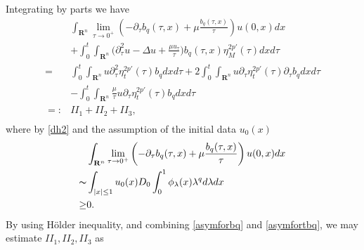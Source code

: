 \documentclass[review]{elsarticle}
\newcommand{\R}{\mathbf{R}}
\begin{document}
Integrating by parts we have
\begin{equation}\label{C17}
\begin{aligned}
&\int_{\R^n}\lim_{\tau\rightarrow 0^+}\left(-\partial_\tau b_q(\tau,x)+\mu\frac{b_q(\tau,x)}{\tau}\right)u(0,x)dx\\
&+\int_0^t\int_{\R^n}\bigg(\partial_\tau^2u-\Delta u +\frac{\mu u_\tau}{\tau}\bigg)b_q(\tau,x)\eta^{2p'}_M(\tau)dxd\tau\\
=&\int_0^t\int_{\R^n}u\partial_\tau^2\eta_t^{2p'}(\tau)b_qdxd\tau+
2\int_0^t\int_{\R^n}u\partial_\tau\eta_t^{2p'}(\tau)\partial_\tau b_qdxd\tau\\
&-\int_0^t\int_{\R^n}\frac{\mu}{\tau}u\partial_\tau\eta_t^{2p'}(\tau)b_qdxd\tau\\
=:& II_1+II_2+II_3,\\
\end{aligned}
\end{equation}
where by \eqref{dh2} and the assumption of the initial data $u_0(x)$
\begin{equation}
\begin{aligned}\label{C00}
&\int_{\R^n}\lim_{\tau\rightarrow 0^+}\left(-\partial_\tau b_q(\tau,x)+\mu\frac{b_q(\tau,x)}{\tau}\right)u(0,x)dx\\
\thicksim &\int_{|x|\le 1}u_0(x)D_0\int_{0}^{1}\phi_\lambda(x)\lambda^{q}d\lambda dx\\
 \ge& 0.
\end{aligned}
\end{equation}
By using H\"{o}lder inequality, and combining \eqref{asymforbq} and \eqref{asymfortbq}, we may estimate $II_1, II_2, II_3$ as
\end{document}

